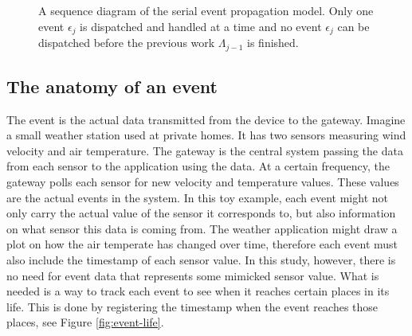 \begin{figure}[h!]

    \caption[A sequence diagram of the serial event propagation model.]{A
    sequence diagram of the serial event propagation model. Only one event
    $\epsilon_j$ is dispatched and handled at a time and no event $\epsilon_j$
    can be dispatched before the previous work $\Lambda_{j-1}$ is finished.}

    \label{fig:event-propagation-serial}
\end{figure}

\subsection{The anatomy of an event}

The event is the actual data transmitted from the device to the gateway.
Imagine a small weather station used at private homes. It has two sensors
measuring wind velocity and air temperature. The gateway is the central system
passing the data from each sensor to the application using the data. At a
certain frequency, the gateway polls each sensor for new velocity and
temperature values. These values are the actual events in the system. In this
toy example, each event might not only carry the actual value of the sensor it
corresponds to, but also information on what sensor this data is coming from.
The weather application might draw a plot on how the air temperate has changed
over time, therefore each event must also include the timestamp of each sensor
value. In this study, however, there is no need for event data that represents
some mimicked sensor value. What is needed is a way to track each event to see
when it reaches certain places in its life. This is done by registering the
timestamp when the event reaches those places, see Figure \ref{fig:event-life}.

